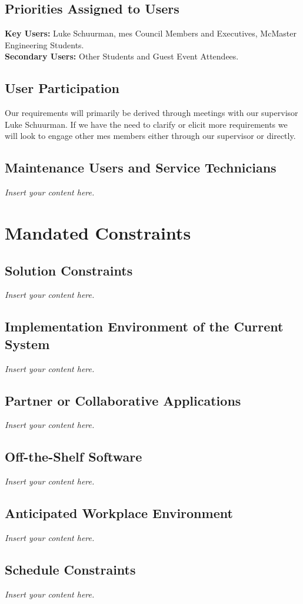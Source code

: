 \documentclass[12pt]{article}
\newcommand{\lips}{\textit{Insert your content here.}}
\begin{document}
\subsection{Priorities Assigned to Users}
\textbf{Key Users:} Luke Schuurman, \gls{mes} Council Members and Executives, McMaster Engineering Students. \\
\textbf{Secondary Users:} Other Students and Guest Event Attendees.
\subsection{User Participation}
Our requirements will primarily be derived through meetings with our supervisor Luke Schuurman. If we have the need to
clarify or elicit more requirements we will look to engage other \gls{mes} members either through our supervisor or
directly.

\subsection{Maintenance Users and Service Technicians}
\lips

\section{Mandated Constraints}
\subsection{Solution Constraints}
\lips
\subsection{Implementation Environment of the Current System}
\lips
\subsection{Partner or Collaborative Applications}
\lips
\subsection{Off-the-Shelf Software}
\lips
\subsection{Anticipated Workplace Environment}
\lips
\subsection{Schedule Constraints}
\lips
\end{document}
